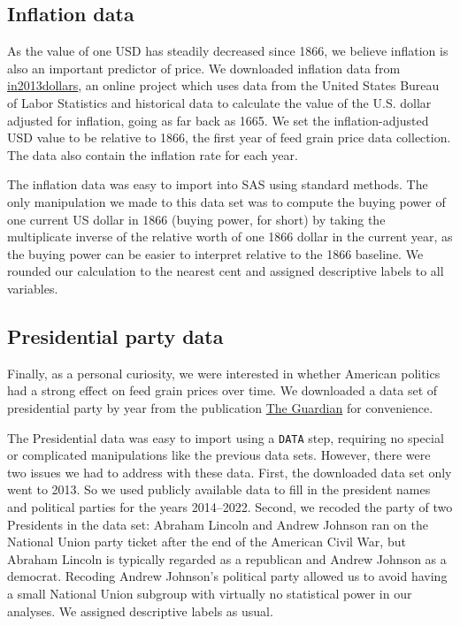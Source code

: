 \documentclass[11pt]{article}
\begin{document}
\subsection*{Inflation data}

As the value of one USD has steadily decreased since 1866, we believe inflation
is also an important predictor of price. We downloaded inflation data from
\href{https://in2013dollars.com}{in2013dollars}, an online project which uses
data from the United States Bureau of Labor Statistics and historical data to
calculate the value of the U.S. dollar adjusted for inflation, going as far
back as 1665. We set the inflation-adjusted USD value to be relative to 1866,
the first year of feed grain price data collection. The data also contain the
inflation rate for each year.

The inflation data was easy to import into SAS using standard methods. The
only manipulation we made to this data set was to compute the buying power of
one current US dollar in 1866 (buying power, for short) by taking the
multiplicate inverse of the relative worth of one 1866 dollar in the current
year, as the buying power can be easier to interpret relative to the 1866
baseline. We rounded our calculation to the nearest cent and assigned
descriptive labels to all variables.

\subsection*{Presidential party data}

Finally, as a personal curiosity, we were interested in whether American
politics had a strong effect on feed grain prices over time. We downloaded a
data set of presidential party by year from the publication
\href{https://www.theguardian.com/news/datablog/2012/oct/15/us-presidents-listed#data}{The
	Guardian} for convenience.

The Presidential data was easy to import using a \texttt{DATA} step, requiring
no special or complicated manipulations like the previous data sets. However,
there were two issues we had to address with these data. First, the downloaded
data set only went to 2013. So we used publicly available
data to fill in the president names and political parties for the years
2014--2022. Second, we recoded the party of two Presidents in the data set:
Abraham Lincoln and Andrew Johnson ran on the National Union party ticket after
the end of the American Civil War, but Abraham Lincoln is typically regarded as
a republican and Andrew Johnson as a democrat. Recoding Andrew Johnson's
political party allowed us to avoid having a small National Union subgroup with
virtually no statistical power in our analyses. We assigned descriptive labels
as usual.
\end{document}
